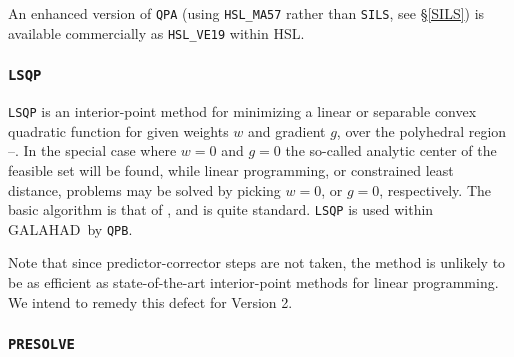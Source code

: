 \documentclass[twoside]{article}
\newcommand{\gal}{{\sf GALAHAD}}
\newcommand{\ltsubsubsection}[1]{\subsubsection{{\tt #1}} \label{#1}}
\begin{document}
An enhanced version of {\tt QPA} (using {\tt HSL\_MA57} rather than {\tt SILS},
see \S\ref{SILS}) is available commercially as {\tt HSL\_VE19} within HSL.

\ltsubsubsection{LSQP}

{\tt LSQP} is an interior-point method for minimizing a linear or 
separable convex quadratic function 
for given weights $w$ and gradient $g$, 
over the polyhedral region --.
In the special case where $w = 0$ and $g = 0$
the so-called analytic center of the feasible set will be found,
while linear programming, or constrained least distance, problems
may be solved by picking $w = 0$, or $g = 0$, respectively.
The basic algorithm is that of , and is quite standard.
{\tt LSQP} is used within \gal\ by {\tt QPB}.

Note that since predictor-corrector steps are not taken, the method
is unlikely to be as efficient as state-of-the-art interior-point 
methods for linear programming. We intend to remedy this defect for
Version 2.

\ltsubsubsection{PRESOLVE}
\end{document}
